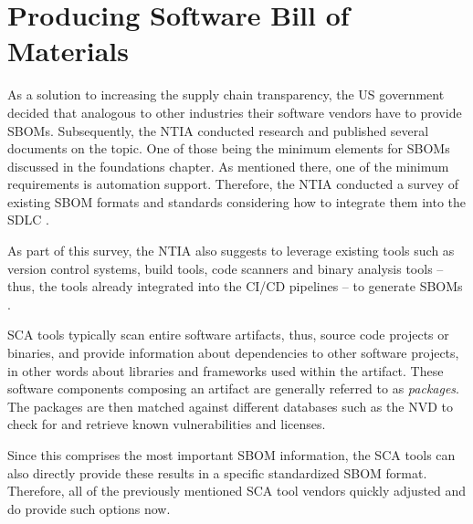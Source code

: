 \section{Producing Software Bill of Materials}
As a solution to increasing the supply chain transparency, the US government decided that analogous to other industries their software vendors have to provide SBOMs. Subsequently, the NTIA conducted research and published several documents on the topic. One of those being the minimum elements for SBOMs discussed in the foundations chapter. As mentioned there, one of the minimum requirements is automation support. Therefore, the NTIA conducted a survey of existing SBOM formats and standards considering how to integrate them into the SDLC \cite{SBOMSurvey}.\par
As part of this survey, the NTIA also suggests to leverage existing tools such as version control systems, build tools, code scanners and binary analysis tools -- thus, the tools already integrated into the CI/CD pipelines -- to generate SBOMs \cite{SBOMSurvey}.\par
SCA tools typically scan entire software artifacts, thus, source code projects or binaries, and provide information about dependencies to other software projects, in other words about libraries and frameworks used within the artifact. These software components composing an artifact are generally referred to as \emph{packages}. The packages are then matched against different databases such as the NVD to check for and retrieve known vulnerabilities and licenses.\par    
Since this comprises the most important SBOM information, the SCA tools can also directly provide these results in a specific standardized SBOM format. Therefore, all of the previously mentioned SCA tool vendors quickly adjusted and do provide such options now.


